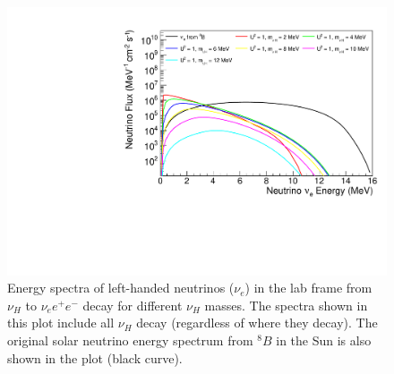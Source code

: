 \documentclass[%
 reprint,
 amsmath,amssymb,
 aps,
 prd,
twocolumn,
]{revtex4-1}
\begin{document}
\begin{figure}[!ht]
\includegraphics[width=0.99\columnwidth]{../plots/nuLSpectrum_U1.0_AllMass_linXlogY.pdf}
\caption{Energy spectra of left-handed neutrinos ($\nu_e$) in the lab frame from $\nu_H$ to $\nu_e e^+ e^-$ decay for different $\nu_H$ masses. The spectra shown in this plot include all $\nu_H$ decay (regardless of where they decay). The original solar neutrino energy spectrum from  $^8B$ in the Sun is also shown in the plot (black curve). }
\label{fig:nuLSpectrum_all_decay} 
\end{figure}
\end{document}
